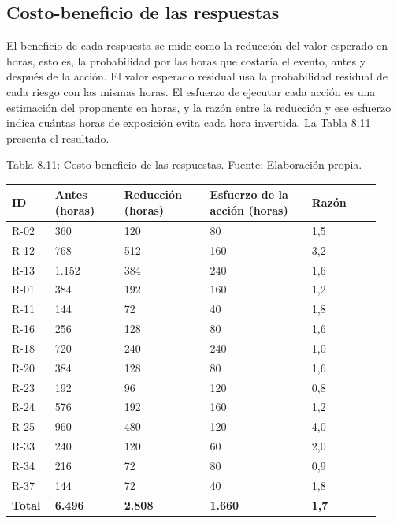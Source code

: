 \documentclass[11pt]{article}
\begin{document}
\subsection{Costo-beneficio de las respuestas}

El beneficio de cada respuesta se mide como la reducción del valor esperado en horas, esto es, la probabilidad por las horas que costaría el evento, antes y después de la acción. El valor esperado residual usa la probabilidad residual de cada riesgo con las mismas horas. El esfuerzo de ejecutar cada acción es una estimación del proponente en horas, y la razón entre la reducción y ese esfuerzo indica cuántas horas de exposición evita cada hora invertida. La Tabla 8.11 presenta el resultado.

Tabla 8.11: Costo-beneficio de las respuestas. Fuente: Elaboración propia.

\begin{longtable}{p{0.099\linewidth}p{0.178\linewidth}p{0.218\linewidth}p{0.258\linewidth}p{0.178\linewidth}}
\toprule
\textbf{ID} & \textbf{Antes (horas)} & \textbf{Reducción (horas)} & \textbf{Esfuerzo de la acción (horas)} & \textbf{Razón} \\
\midrule
\endhead
\bottomrule
\endlastfoot
R-02 & 360 & 120 & 80 & 1,5 \\
R-12 & 768 & 512 & 160 & 3,2 \\
R-13 & 1.152 & 384 & 240 & 1,6 \\
R-01 & 384 & 192 & 160 & 1,2 \\
R-11 & 144 & 72 & 40 & 1,8 \\
R-16 & 256 & 128 & 80 & 1,6 \\
R-18 & 720 & 240 & 240 & 1,0 \\
R-20 & 384 & 128 & 80 & 1,6 \\
R-23 & 192 & 96 & 120 & 0,8 \\
R-24 & 576 & 192 & 160 & 1,2 \\
R-25 & 960 & 480 & 120 & 4,0 \\
R-33 & 240 & 120 & 60 & 2,0 \\
R-34 & 216 & 72 & 80 & 0,9 \\
R-37 & 144 & 72 & 40 & 1,8 \\
\textbf{Total} & \textbf{6.496} & \textbf{2.808} & \textbf{1.660} & \textbf{1,7} \\
\end{longtable}
\end{document}
